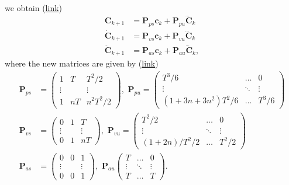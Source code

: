 we obtain (\href{https://github.com/mhubii/nmpc_pattern_generator/blob/5a213044c927dc6aac9f7e32ce1e5fb472cd67bb/libs/pattern_generator/src/base_generator.cpp#L887}{link})
\begin{align}
	\bm{C}_{k+1} &= \bm{P}_{ps} \bm{c}_k + \bm{P}_{pu}\dddot{\bm{C}}_k\\
	\dot{\bm{C}}_{k+1} &= \bm{P}_{vs} \bm{c}_k + \bm{P}_{vu}\dddot{\bm{C}}_k\\
	\ddot{\bm{C}}_{k+1} &= \bm{P}_{as} \bm{c}_k + \bm{P}_{au}\dddot{\bm{C}}_k,
\end{align}
where the new matrices are given by (\href{https://github.com/mhubii/nmpc_pattern_generator/blob/5a213044c927dc6aac9f7e32ce1e5fb472cd67bb/libs/pattern_generator/src/base_generator.cpp#L403}{link})
\begin{align}
	\bm{P}_{ps} &= \begin{pmatrix}
	1 & T & T^2/2 \\
	\vdots & & \vdots \\
	1 & nT & n^2T^2/2
	\end{pmatrix},\,\,
	\bm{P}_{pu} = \begin{pmatrix}
	T^3/6 & \dots & 0 \\
	\vdots & \ddots & \vdots \\
	(1+3n+3n^2)T^2/6 & \dots & T^3/6
	\end{pmatrix} \\
	\bm{P}_{vs} &= \begin{pmatrix}
	0 & 1 & T \\
	\vdots & & \vdots \\
	0 & 1 & nT
	\end{pmatrix},\,\,
	\bm{P}_{vu} = \begin{pmatrix}
	T^2/2 & \dots & 0 \\
	\vdots & \ddots & \vdots \\
	(1+2n)/T^2/2 & \dots & T^2/2
	\end{pmatrix} \\
	\bm{P}_{as} &= \begin{pmatrix}
	0 & 0 & 1 \\
	\vdots  &  & \vdots \\
	 0 & 0 & 1
	\end{pmatrix},\,\,
	\bm{P}_{au}\begin{pmatrix}
	T & \dots & 0 \\
	\vdots & \ddots & \vdots \\
	T & \dots & T
	\end{pmatrix}.
\end{align}
